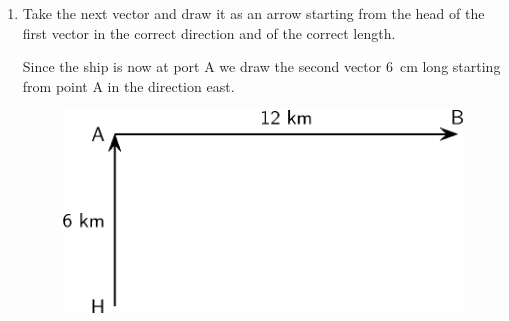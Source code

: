 {\begin{mdframed}[linewidth=4, leftmargin=40, rightmargin=40]
\begin{exercise}
\begin{enumerate}[noitemsep, label=\textbf{Step} \textbf{\arabic*}. ]
\begin{figure}[H]
\begin{center}
      \vspace{2pt}
    \vspace{.1in}
    
    \end{center}

 \end{figure}   

    \addtocounter{footnote}{-0}
    
          \par 
          \item  
\label{m38815*id63422}Take the next vector and draw it as an arrow starting from the
head of the first vector in the correct direction and of the
correct length. 
\par 
          \label{m38815*id189477}Since the ship is now at port A we draw the second vector 6~cm long starting from point A in the direction east.\par 
          \label{m38815*id189483}
            
    \setcounter{subfigure}{0}


	\begin{figure}[H] %
    \begin{center}
    \label{m38815*id189486!!!underscore!!!media}\label{m38815*id189486!!!underscore!!!printimage}\includegraphics{col11305.imgs/m38815_PG11C1_042.png} %
        
      \vspace{2pt}
    \vspace{.1in}
    
    \end{center}

 \end{figure}   

    \addtocounter{footnote}{-0}
    

\end{enumerate}
\end{exercise}
\end{mdframed}}
